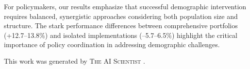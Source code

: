 \documentclass{article} %
\begin{document}
For policymakers, our results emphasize that successful demographic intervention requires balanced, synergistic approaches considering both population size and structure. The stark performance differences between comprehensive portfolios (+12.7--13.8\%) and isolated implementations (--5.7--6.5\%) highlight the critical importance of policy coordination in addressing demographic challenges.

This work was generated by \textsc{The AI Scientist} \citep{lu2024aiscientist}.



\end{document}
